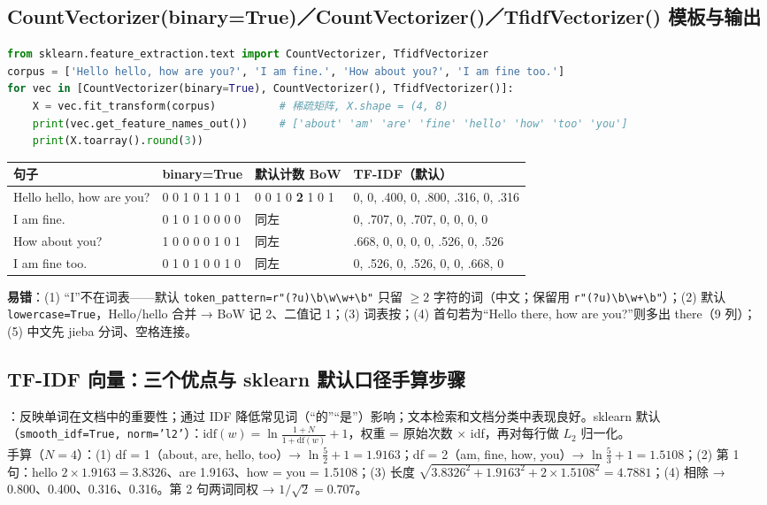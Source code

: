 \subsection{CountVectorizer(binary=True)／CountVectorizer()／TfidfVectorizer() 模板与输出}
\begin{lstlisting}[language=Python]
from sklearn.feature_extraction.text import CountVectorizer, TfidfVectorizer
corpus = ['Hello hello, how are you?', 'I am fine.', 'How about you?', 'I am fine too.']
for vec in [CountVectorizer(binary=True), CountVectorizer(), TfidfVectorizer()]:
    X = vec.fit_transform(corpus)          # 稀疏矩阵, X.shape = (4, 8)
    print(vec.get_feature_names_out())     # ['about' 'am' 'are' 'fine' 'hello' 'how' 'too' 'you']
    print(X.toarray().round(3))
\end{lstlisting}
\vspace{-6pt}
\begin{center}\small
\begin{tabularx}{\linewidth}{@{}p{3.5cm}p{2.5cm}p{2.5cm}L@{}}
\toprule
句子 & binary=True & 默认计数 BoW & TF-IDF（默认）\\
\midrule
Hello hello, how are you? & 0 0 1 0 1 1 0 1 & 0 0 1 0 \textbf{2} 1 0 1 & 0, 0, .400, 0, .800, .316, 0, .316 \\
I am fine. & 0 1 0 1 0 0 0 0 & 同左 & 0, .707, 0, .707, 0, 0, 0, 0 \\
How about you? & 1 0 0 0 0 1 0 1 & 同左 & .668, 0, 0, 0, 0, .526, 0, .526 \\
I am fine too. & 0 1 0 1 0 0 1 0 & 同左 & 0, .526, 0, .526, 0, 0, .668, 0 \\
\bottomrule
\end{tabularx}
\end{center}
\textbf{易错}：(1) “I”不在词表——默认 \texttt{token\_pattern=r"(?u)\textbackslash b\textbackslash w\textbackslash w+\textbackslash b"} 只留 $\ge2$ 字符的词（中文；保留用 \texttt{r"(?u)\textbackslash b\textbackslash w+\textbackslash b"}）；(2) 默认 \texttt{lowercase=True}，Hello/hello 合并 → BoW 记 2、二值记 1；(3) 词表按；(4) 首句若为“Hello there, how are you?”则多出 there（9 列）；(5) 中文先 jieba 分词、空格连接。

\subsection{TF-IDF 向量：三个优点与 sklearn 默认口径手算步骤}
：反映单词在文档中的重要性；通过 IDF 降低常见词（“的”“是”）影响；文本检索和文档分类中表现良好。sklearn 默认（\texttt{smooth\_idf=True, norm='l2'}）：$\mathrm{idf}(w)=\ln\frac{1+N}{1+\mathrm{df}(w)}+1$，权重 = 原始次数 × idf，再对每行做 $L_2$ 归一化。\\
手算（$N=4$）：(1) df = 1（about, are, hello, too）→ $\ln\frac52+1=1.9163$；df = 2（am, fine, how, you）→ $\ln\frac53+1=1.5108$；(2) 第 1 句：hello $2\times1.9163=3.8326$、are 1.9163、how = you = 1.5108；(3) 长度 $\sqrt{3.8326^2+1.9163^2+2\times1.5108^2}=4.7881$；(4) 相除 → 0.800、0.400、0.316、0.316。第 2 句两词同权 → $1/\sqrt2=0.707$。

